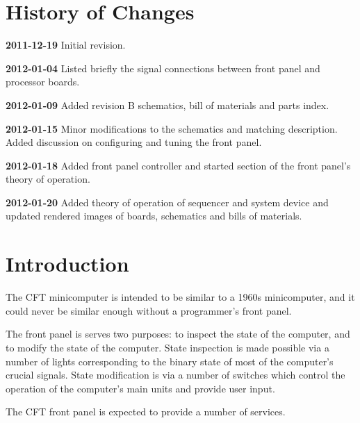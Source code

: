\label{chap:pfp}
  \section*{History of Changes}

  {\bfseries 2011-12-19} Initial revision.

  {\bfseries 2012-01-04} Listed briefly the signal connections between front
  panel and processor boards.

  {\bfseries 2012-01-09} Added revision B schematics, bill of materials and parts index.

  {\bfseries 2012-01-15} Minor modifications to the schematics and matching
  description. Added discussion on configuring and tuning the front
  panel.

  {\bfseries 2012-01-18} Added front panel controller and started section of the
  front panel's theory of operation.

  {\bfseries 2012-01-20} Added theory of operation of sequencer and system device and
  updated rendered images of boards, schematics and bills of materials.

\section{Introduction}

The CFT minicomputer is intended to be similar to a 1960s
minicomputer, and it could never be similar enough without a
programmer's front panel.

The front panel is serves two purposes: to inspect the state of the
computer, and to modify the state of the computer. State inspection is
made possible via a number of lights corresponding to the binary state
of most of the computer's crucial signals. State modification is via a
number of switches which control the operation of the computer's main
units and provide user input.

The CFT front panel is expected to provide a number of services.


